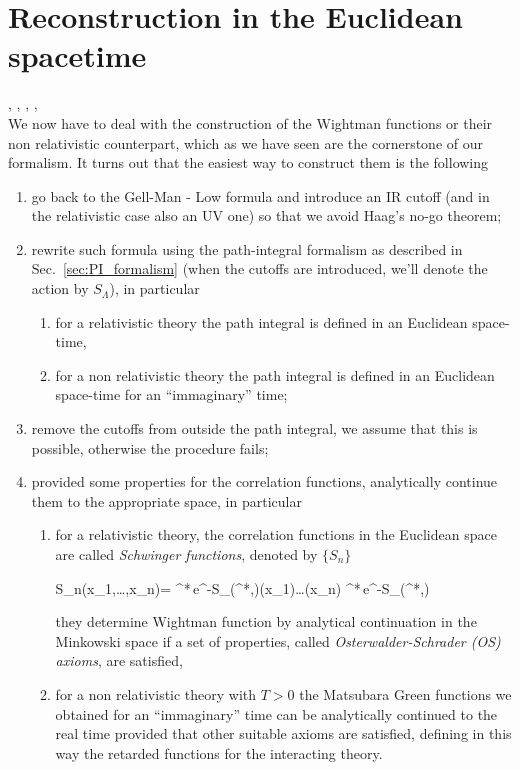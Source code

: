 \documentclass[../main/main.tex]{subfiles}
\begin{document}
\chapter{Reconstruction in the Euclidean spacetime}

\cite[Pages 185-191]{Streater:2000}, \cite{Summers:2016}, \cite{Wightman:1976}, \cite[Section 5.1]{Strocchi_2013}, \cite[Section 6.1, Chapter 19]{Glimm:1987}\\

We now have to deal with the construction of the Wightman functions or their non relativistic counterpart, which as we have seen are the cornerstone of our formalism. It turns out that the easiest way to construct them is the following
\begin{enumerate}[label=(\arabic*)]
	\item go back to the Gell-Man - Low formula and introduce an IR cutoff (and in the relativistic case also an UV one) so that we avoid Haag's no-go theorem;
	\item rewrite such formula using the path-integral formalism as described in Sec.~\ref{sec:PI_formalism} (when the cutoffs are introduced, we'll denote the action by $S_\Lambda$), in particular
	\begin{enumerate}[label=(\alph*)]
		\item for a relativistic theory the path integral is defined in an Euclidean space-time,
		\item for a non relativistic theory the path integral is defined in an Euclidean space-time for an ``immaginary'' time;
	\end{enumerate}
	\item remove the cutoffs from outside the path integral, we assume that this is possible, otherwise the procedure fails;
	\item provided some properties for the correlation functions, analytically continue them to the appropriate space, in particular
	\begin{enumerate}[label=(\alph*)]
		\item for a relativistic theory, the correlation functions in the Euclidean space are called \emph{Schwinger functions}, denoted by $\{S_n\}$
		\begin{eq}
			S_n(x_1,\ldots,x_n)=\limcutrem \frac%
			{\int\pide\phi\pide\phi^*\,e^{-S_\Lambda(\phi^*,\phi)}\phi(x_1)\ldots\phi(x_n)}
			{\int\pide\phi\pide\phi^*\,e^{-S_\Lambda(\phi^*,\phi)}}
		\end{eq}
		they determine Wightman function by analytical continuation in the Minkowski space if a set of properties, called \emph{Osterwalder-Schrader (OS) axioms}, are satisfied,
		\item for a non relativistic theory with $T>0$ the Matsubara Green functions we obtained for an ``immaginary'' time can be analytically continued to the real time provided that other suitable axioms are satisfied, defining in this way the retarded functions for the interacting theory.
	\end{enumerate}
\end{enumerate}
\end{document}
